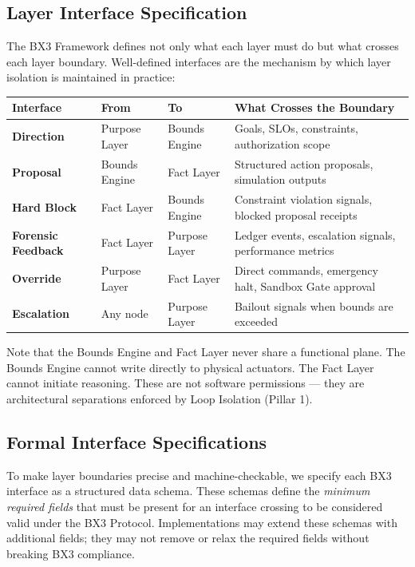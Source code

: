 \documentclass[12pt]{article}
\theoremstyle{plain}
\begin{document}
\subsection{Layer Interface Specification}

The BX3 Framework defines not only what each layer must do but what crosses each layer boundary. Well-defined interfaces are the mechanism by which layer isolation is maintained in practice:

\begin{center}
\begin{tabular}{>{\bfseries}p{3cm} p{2.2cm} p{2.2cm} p{6cm}}
\toprule
\textbf{Interface} & \textbf{From} & \textbf{To} & \textbf{What Crosses the Boundary} \\
\midrule
Direction & Purpose Layer & Bounds Engine & Goals, SLOs, constraints, authorization scope \\
\addlinespace
Proposal & Bounds Engine & Fact Layer & Structured action proposals, simulation outputs \\
\addlinespace
Hard Block & Fact Layer & Bounds Engine & Constraint violation signals, blocked proposal receipts \\
\addlinespace
Forensic Feedback & Fact Layer & Purpose Layer & Ledger events, escalation signals, performance metrics \\
\addlinespace
Override & Purpose Layer & Fact Layer & Direct commands, emergency halt, Sandbox Gate approval \\
\addlinespace
Escalation & Any node & Purpose Layer & Bailout signals when bounds are exceeded \\
\bottomrule
\end{tabular}
\end{center}

\vspace{0.5em}
\noindent Note that the Bounds Engine and Fact Layer never share a functional plane. The Bounds Engine cannot write directly to physical actuators. The Fact Layer cannot initiate reasoning. These are not software permissions --- they are architectural separations enforced by Loop Isolation (Pillar 1).

\subsection{Formal Interface Specifications}\label{sec:interfaces}

To make layer boundaries precise and machine-checkable, we specify each BX3 interface as a structured data schema. These schemas define the \textit{minimum required fields} that must be present for an interface crossing to be considered valid under the BX3 Protocol. Implementations may extend these schemas with additional fields; they may not remove or relax the required fields without breaking BX3 compliance.
\end{document}
